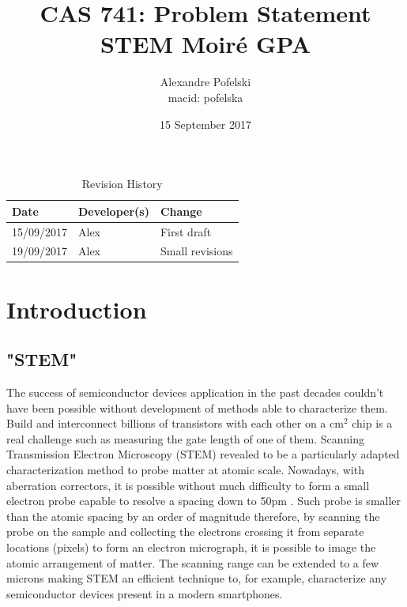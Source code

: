 \documentclass{article}
\title{CAS 741: Problem Statement\\STEM Moir{\'e} GPA}
\author{Alexandre Pofelski \\
macid: pofelska}
\date{15 September 2017}
\begin{document}
\maketitle
\clearpage

\begin{table}[hp]
\caption{Revision History} \label{TblRevisionHistory}
\begin{tabularx}{\textwidth}{llX}
\toprule
\textbf{Date} & \textbf{Developer(s)} & \textbf{Change}\\
\midrule
15/09/2017 & Alex & First draft\\
19/09/2017 & Alex & Small revisions\\
\bottomrule
\end{tabularx}
\end{table}

\clearpage
\tableofcontents
\clearpage

\section{Introduction}
\subsection{"STEM"}
The success of semiconductor devices application in the past decades couldn't 
have been possible without development of methods able to characterize them. 
Build and interconnect billions of transistors with each other on a cm$^{2}$ 
chip is a real challenge such as measuring the gate length of one of them. 
Scanning Transmission Electron Microscopy (STEM) revealed to be a particularly 
adapted characterization method to probe matter at atomic scale. 
Nowadays, with aberration correctors, it is possible without much difficulty to 
form a small electron probe capable to resolve a spacing down to 50pm 
\cite{Erni2009}. Such probe is smaller than the atomic spacing by an order of 
magnitude therefore, by scanning the probe on the sample and collecting the 
electrons crossing it from separate locations (pixels) to form an electron 
micrograph, it is possible to image the atomic arrangement of matter. The 
scanning range can be extended to a few microns making STEM an efficient 
technique to, for example, characterize any semiconductor devices present in a 
modern smartphones.
\end{document}
